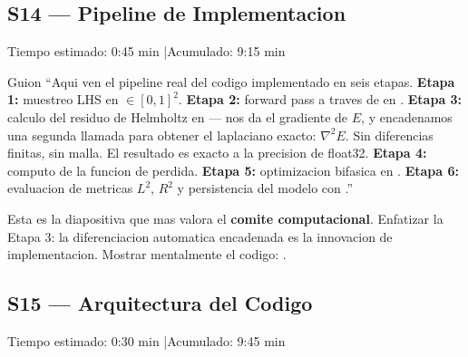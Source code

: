 \subsection{S14 --- Pipeline de Implementacion}

\begin{timebox}
Tiempo estimado: 0:45 min \quad|\quad Acumulado: 9:15 min
\end{timebox}
\vspace{4pt}

\begin{slidebox}{Guion}
``Aqui ven el pipeline real del codigo implementado en seis etapas.
\textbf{Etapa 1:} muestreo LHS en  $\in [0,1]^2$.
\textbf{Etapa 2:} forward pass a traves de  en
.
\textbf{Etapa 3:} calculo del residuo de Helmholtz en  ---
 nos da el gradiente de $E$, y encadenamos una segunda
llamada para obtener el laplaciano exacto: $\nabla^2 E$. Sin diferencias finitas,
sin malla. El resultado es exacto a la precision de float32.
\textbf{Etapa 4:} computo de la funcion de perdida.
\textbf{Etapa 5:} optimizacion bifasica en .
\textbf{Etapa 6:} evaluacion de metricas $L^2$, $R^2$ y persistencia del modelo
con .''
\end{slidebox}
\vspace{4pt}

\begin{tipbox}
Esta es la diapositiva que mas valora el \textbf{comite computacional}.
Enfatizar la Etapa 3: la diferenciacion automatica encadenada es la innovacion
de implementacion. Mostrar mentalmente el codigo: .
\end{tipbox}

\vspace{8pt}

\subsection{S15 --- Arquitectura del Codigo}

\begin{timebox}
Tiempo estimado: 0:30 min \quad|\quad Acumulado: 9:45 min
\end{timebox}
\vspace{4pt}

